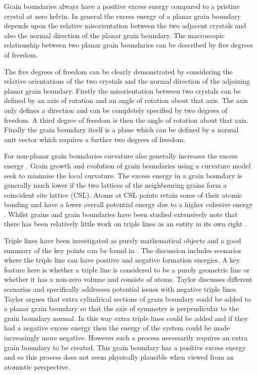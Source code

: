 \documentclass[12pt,a4paper,openany]{report}
\begin{document}
Grain boundaries always have a positive excess energy compared to a pristine crystal at zero kelvin. In general the excess energy of a planar grain boundary depends upon the relative misorientation between the two adjacent crystals and also the normal direction of the planar grain boundary. The macroscopic relationship between two planar grain boundaries can be described by five degrees of freedom. 

The five degrees of freedom can be clearly demonstrated by considering the relative orientations of the two crystals and the normal direction of the adjoining planar grain boundary. Firstly the misorientation between two crystals can be defined by an axis of rotation and an angle of rotation about that axis.  The axis only defines a direction and can be completely specified by two degrees of freedom. A third degree of freedom is then the angle of rotation about that axis. Finally the grain boundary itself is a plane which can be defined by a normal unit vector which requires a further two degrees of freedom.

For non-planar grain boundaries curvature also generally increases the excess energy \cite{Mason2015}. Grain growth and evolution of grain boundaries using a curvature model seek to minimise the local curvature.  The excess energy in a grain boundary is generally much lower if the two lattices of the neighbouring grains form a coincident site lattice (CSL). Atoms at CSL points retain some of their atomic bonding and have a lower overall potential energy due to a higher cohesive energy \cite{Rohrer2011}. Whilst grains and grain boundaries have been studied extensively \citeauthor{Chaix:149279} note that there has been relatively little work on triple lines as an entity in its own right \cite{Chaix:149279}.
 
Triple lines have been investigated as purely mathematical objects and a good summary of the key points can be found in \cite{Taylor1999}. The discussion includes scenarios where the triple line can have positive and negative formation energies. A key feature here is whether a triple line is considered to be a purely geometric line or whether it has a non-zero volume and consists of atoms. Taylor discusses different scenarios and specifically addresses potential issues with negative triple lines. Taylor argues that extra cylindrical sections of grain boundary could be added to a planar grain boundary so that the axis of symmetry is perpendicular to the grain boundary normal. In this way extra triple lines could be added and if they had a negative excess energy then the energy of the system could be made increasingly more negative. However such a process necessarily requires an extra grain boundary to be created. This grain boundary has a positive excess energy and so this process does not seem physically plausible when viewed from an atomistic perspective.
\end{document}
